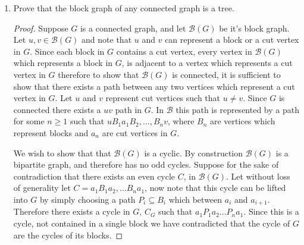 \documentclass[12pt]{article}
\begin{document}
\begin{enumerate}
\begin{enumerate}
\begin{itemize}
\begin{proof}
		\end{proof}



		\item No cycle in $G$ has a chord.
		\begin{proof} Let $G$ be 2-connected and suppose that no cycle in $G$ has a chord. Suppose for the sake of contradiction that $G$ is not critically 2-connected. Therefore there exists an edge $e$ such that $G - e$ is still 2-connected. Let $x, y \in G$ incident to $e$. Since $G - e$ is 2 connected, $G - e$ is at least 2-edge connected. By Menger's Theroem there exists at least 2 edge-disjoint paths between $a$ and $b$ in $G - e$. These paths form a cycle, and hence $e$ was a chord in a cycle in $G$ a contradiction.   
		\end{proof}
		\end{itemize}
	\end{enumerate}
\newpage









\item Prove that the block graph of any connected graph is a tree.
\begin{proof} Suppose $G$ is a connected graph, and let $\mathcal{B}(G)$ be it's block graph. 
	Let $u, v \in \mathcal{B}(G)$ and note that $u$ and $v$ can represent a block or a cut vertex in $G$. Since each block in $G$ contains a cut vertex, every vertex in $\mathcal{B}(G)$ which represents a block in $G$, is adjacent to a vertex which represents a cut vertex in $G$ therefore to show that $\mathcal{B}(G)$ is connected, it is sufficient to show that there exists a path between any two vertices which represent a cut vertex in $G$. 
	Let $u$ and $v$ represent cut vertices such that $u \neq v$. Since $G$ is connected there exists a $uv$ path in $G$. In $\mathcal{B}$ this path is represented by a path for some $n \geq 1$ such that $uB_1a_1B_2,\dots, B_nv$, where $B_n$ are vertices which represent blocks and $a_n$ are cut vertices in $G$. 


	We wish to show that that $\mathcal{B}(G)$ is a cyclic. By construction $\mathcal{B}(G)$ is a bipartite graph, and therefore has no odd cycles. Suppose for the sake of contradiction that there exists an even cycle $C$, in $\mathcal{B}(G)$. Let without loss of generality let $C = a_1B_1a_2, ...B_na_1$, now note that this cycle can be lifted into $G$ by simply choosing a path $P_i \subseteq B_i$ which between $a_i$ and $a_{i + 1}$. Therefore there exists a cycle in $G$, $C_G$ such that $a_1P_1a_2...P_na_1$. Since this is a cycle, not contained in a single block we have contradicted that the cycle of $G$ are the cycles of its blocks.  



\end{proof}
\end{enumerate}
\end{document}
